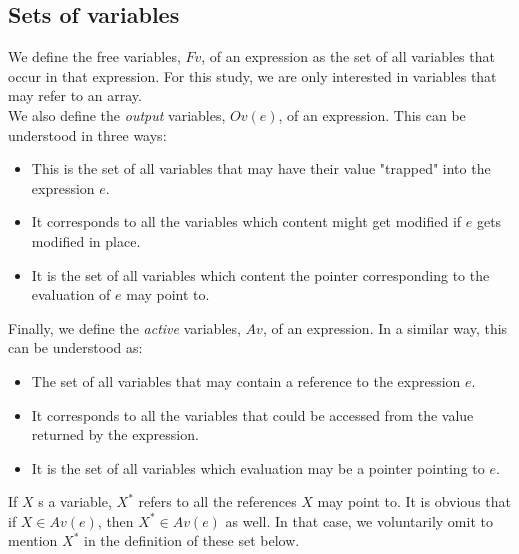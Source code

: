 \documentclass[12pt,a4paper]{article}
\begin{document}
\subsection{Sets of variables}


We define the free variables, $Fv$, of an expression as the set of all variables that occur in that expression. For this study, we are only interested in variables that may refer to an array.\\

We also define the \emph{output} variables, $Ov(e)$, of an expression. This can be understood in three ways:
\begin{itemize}
\item This is the set of all variables that may have their value "trapped" into the expression $e$.
\item It corresponds to all the variables which content might get modified if $e$ gets modified in place.
\item It is the set of all variables which content the pointer corresponding to the evaluation of $e$ may point to.
\end{itemize}

Finally, we define the \emph{active} variables, $Av$, of an expression. In a similar way, this can be understood as:
\begin{itemize}
\item The set of all variables that may contain a reference to the expression $e$.
\item It corresponds to all the variables that could be accessed from the value returned by the expression.
\item It is the set of all variables which evaluation may be a pointer pointing to $e$.
\end{itemize}

If $X$ s a variable, $X^*$ refers to all the references $X$ may point to. It is obvious that if $X \in Av(e)$, then $X^* \in Av(e)$ as well. In that case, we voluntarily omit to mention $X^*$ in the definition of these set below.
\end{document}
